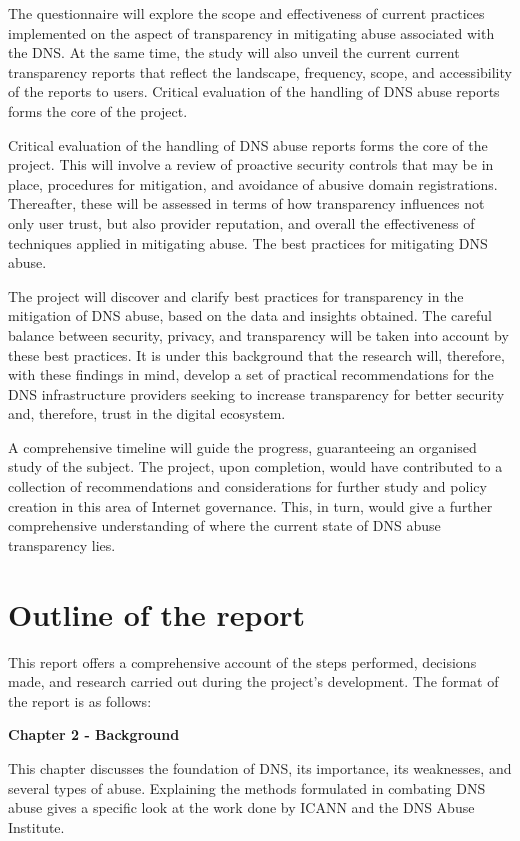 The questionnaire will explore the scope and effectiveness of current practices implemented on the aspect of transparency in mitigating abuse associated with the DNS. At the same time, the study will also unveil the current current transparency reports that reflect the landscape, frequency, scope, and accessibility of the reports to users. Critical evaluation of the handling of DNS abuse reports forms the core of the project.

Critical evaluation of the handling of DNS abuse reports forms the core of the project. This will involve a review of proactive security controls that may be in place, procedures for mitigation, and avoidance of abusive domain registrations. Thereafter, these will be assessed in terms of how transparency influences not only user trust, but also provider reputation, and overall the effectiveness of techniques applied in mitigating abuse. The best practices for mitigating DNS abuse.

The project will discover and clarify best practices for transparency in the mitigation of DNS abuse, based on the data and insights obtained. The careful balance between security, privacy, and transparency will be taken into account by these best practices. It is under this background that the research will, therefore, with these findings in mind, develop a set of practical recommendations for the DNS infrastructure providers seeking to increase transparency for better security and, therefore, trust in the digital ecosystem.

A comprehensive timeline will guide the progress, guaranteeing an organised study of the subject. The project, upon completion, would have contributed to a collection of recommendations and considerations for further study and policy creation in this area of Internet governance. This, in turn, would give a further comprehensive understanding of where the current state of DNS abuse transparency lies.

\section{Outline of the report}

This report offers a comprehensive account of the steps performed, decisions made, and research carried out during the project's development. The format of the report is as follows:

\textbf{Chapter 2 - Background }

This chapter discusses the foundation of DNS, its importance, its weaknesses, and several types of abuse. Explaining the methods formulated in combating DNS abuse gives a specific look at the work done by ICANN and the DNS Abuse Institute.

